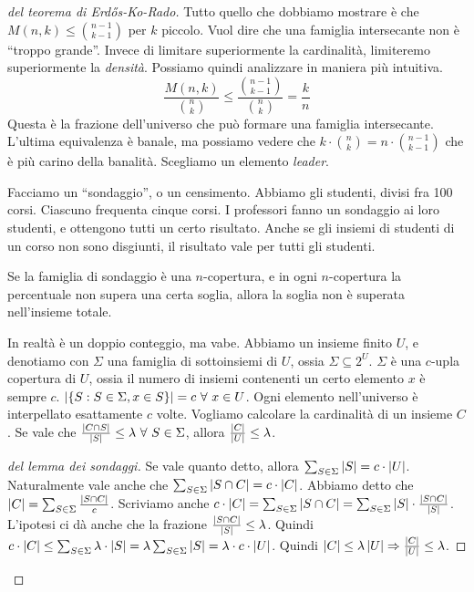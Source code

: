 		\begin{proof}[del teorema di Erd\H{o}s-Ko-Rado]
			Tutto quello che dobbiamo mostrare \`e che $M(n,k) \le \binom{n-1}{k-1}$ per $k$ piccolo.
			Vuol dire che una famiglia intersecante non \`e ``troppo grande''.
			Invece di limitare superiormente la cardinalit\`a, limiteremo superiormente la \emph{densit\`a}.
			Possiamo quindi analizzare in maniera pi\`u intuitiva.
			\[
				\frac{M(n,k)}{\binom{n}{k}} \le \frac{\binom{n-1}{k-1}}{\binom{n}{k}} = \frac{k}{n}
			\]
			Questa \`e la frazione dell'universo che pu\`o formare una famiglia intersecante.
			L'ultima equivalenza \`e banale, ma possiamo vedere che $k \cdot \binom{n}{k} = n \cdot \binom{n-1}{k-1}$ che \`e pi\`u carino della banalit\`a.
			Scegliamo un elemento \emph{leader}.

			Facciamo un ``sondaggio'', o un censimento.
			Abbiamo gli studenti, divisi fra 100 corsi.
			Ciascuno frequenta cinque corsi.
			I professori fanno un sondaggio ai loro studenti, e ottengono tutti un certo risultato.
			Anche se gli insiemi di studenti di un corso non sono disgiunti, il risultato vale per tutti gli studenti.

			Se la famiglia di sondaggio \`e una $n$-copertura, e in ogni $n$-copertura la percentuale non supera una certa soglia, allora la soglia non \`e superata nell'insieme totale.

			\begin{lemma}
				In realt\`a \`e un doppio conteggio, ma vabe.
				Abbiamo un insieme finito $U$, e denotiamo con $\Sigma$ una famiglia di sottoinsiemi di $U$, ossia $\Sigma \subseteq 2^{U}$.
				$\Sigma$ \`e una $c$-upla copertura di $U$, ossia il numero di insiemi contenenti un certo elemento $x$ \`e sempre $c$.
				$\abs{\{S : S \in \Sigma, x \in S \}} = c \forall x \in U$.
				Ogni elemento nell'universo \`e interpellato esattamente $c$ volte.
				Vogliamo calcolare la cardinalit\`a di un insieme $C$.
				Se vale che $\frac{\abs{C \cap S}}{\abs{S}} \le \lambda \forall S \in \Sigma$, allora $\frac{\left\lvert{C}\right\rvert}{\left\lvert{U}\right\rvert} \le \lambda$.
			\end{lemma}
			\begin{proof}[del lemma dei sondaggi]
				Se vale quanto detto, allora $\sum_{S \in \Sigma} \left\lvert{S}\right\rvert = c \cdot \left\lvert{U}\right\rvert$.
				Naturalmente vale anche che $\sum_{S \in \Sigma} \left\lvert{S \cap C}\right\rvert = c \cdot \left\lvert{C}\right\rvert$.
				Abbiamo detto che $\left\lvert{C}\right\rvert = \sum_{S \in \Sigma} \frac{\left\lvert{S \cap C}\right\rvert}{c}$.
				Scriviamo anche $c \cdot \left\lvert{C}\right\rvert = \sum_{S \in \Sigma} \left\lvert{S \cap C}\right\rvert = \sum_{S \in \Sigma} \left\lvert{S}\right\rvert \cdot \frac{\left\lvert{S \cap C}\right\rvert}{\left\lvert{S}\right\rvert}$.
				L'ipotesi ci d\`a anche che la frazione $\frac{\left\lvert{S \cap C}\right\rvert}{\left\lvert{S}\right\rvert} \le \lambda$.
				Quindi $c \cdot \left\lvert{C}\right\rvert \le \sum_{S \in \Sigma} \lambda \cdot \left\lvert{S}\right\rvert = \lambda \sum_{S \in \Sigma} \left\lvert{S}\right\rvert = \lambda \cdot c \cdot \left\lvert{U}\right\rvert$.
				Quindi $\left\lvert{C}\right\rvert \le \lambda \left\lvert{U}\right\rvert \Rightarrow \frac{\left\lvert{C}\right\rvert}{\left\lvert{U}\right\rvert} \le \lambda$.
			\end{proof}


\end{proof}
